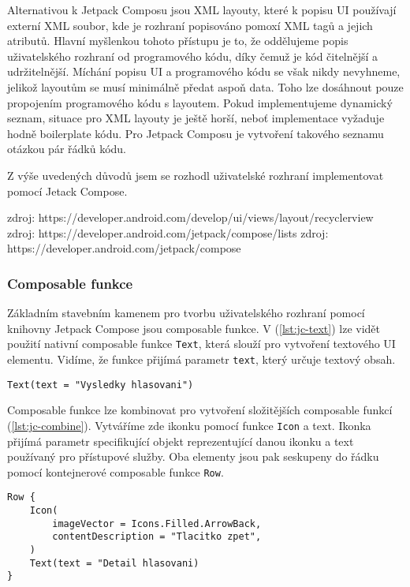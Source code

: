 Alternativou k Jetpack Composu jsou XML layouty, které k popisu UI používají externí XML soubor, kde je rozhraní popisováno pomoxí XML tagů a jejich atributů. Hlavní myšlenkou tohoto přístupu je to, že oddělujeme popis uživatelského rozhraní od programového kódu, díky čemuž je kód čitelnější a udržitelnější. Míchání popisu UI a programového kódu se však nikdy nevyhneme, jelikož layoutům se musí minimálně předat aspoň data. Toho lze dosáhnout pouze propojením programového kódu s layoutem. Pokud implementujeme dynamický seznam, situace pro XML layouty je ještě horší, neboť implementace vyžaduje hodně boilerplate kódu. Pro Jetpack Composu je vytvoření takového seznamu otázkou pár řádků kódu.

Z výše uvedených důvodů jsem se rozhodl uživatelské rozhraní implementovat pomocí Jetack Compose.

\vspace*{10px}
\noindent zdroj: https://developer.android.com/develop/ui/views/layout/recyclerview
\noindent zdroj: https://developer.android.com/jetpack/compose/lists
zdroj: https://developer.android.com/jetpack/compose

\vspace*{10px}

\subsubsection*{Composable funkce}
Základním stavebním kamenem pro tvorbu uživatelského rozhraní pomocí knihovny Jetpack Compose jsou composable funkce. V (\ref{lst:jc-text}) lze vidět použití nativní composable funkce \lstinline|Text|, která slouží pro vytvoření textového UI elementu. Vidíme, že funkce přijímá parametr \lstinline|text|, který určuje textový obsah.

\begin{lstlisting}[caption={Příklad použití composable funkce Text.}, label={lst:jc-text}]
Text(text = "Vysledky hlasovani")
\end{lstlisting}

\noindent Composable funkce lze kombinovat pro vytvoření složitějších composable funkcí (\ref{lst:jc-combine}). Vytváříme zde ikonku pomocí funkce \lstinline|Icon| a text. Ikonka přijímá parametr specifikující objekt reprezentující danou ikonku a text používaný pro přístupové služby. Oba elementy jsou pak seskupeny do řádku pomocí kontejnerové composable funkce \lstinline|Row|.

\begin{lstlisting}[caption={Příklad skládání composable funkcí. Vykreslí ikonku a text vedle sebe.}, label={lst:jc-combine}, tabsize=2]
Row {
	Icon(
		imageVector = Icons.Filled.ArrowBack,
		contentDescription = "Tlacitko zpet",
	)
	Text(text = "Detail hlasovani)
}
\end{lstlisting}

